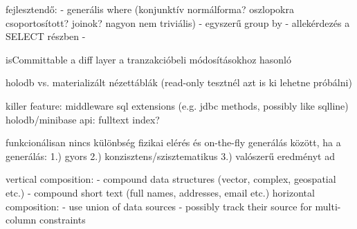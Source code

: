 \documentclass[
    parspace, %
    noindent, %
]{elteiktdk}[2023/04/10]
\begin{document}
{fejlesztendő:
- generális where (konjunktív normálforma? oszlopokra csoportosított? joinok? nagyon nem triviális)
- egyszerű group by
- allekérdezés a SELECT részben
- 

isCommittable
a diff layer a tranzakcióbeli módosításokhoz hasonló

holodb vs. materializált nézettáblák
(read-only tesztnél azt is ki lehetne próbálni)

killer feature: middleware
sql extensions (e.g. jdbc methods, possibly like sqlline)
holodb/minibase api: fulltext index?

funkcionálisan nincs különbség fizikai elérés és on-the-fly generálás között, ha a generálás:
1.) gyors
2.) konzisztens/szisztematikus
3.) valószerű eredményt ad

vertical composition: 
- compound data structures (vector, complex, geospatial etc.)
- compound short text (full names, addresses, email etc.)
horizontal composition:
- use union of data sources
- possibly track their source for multi-column constraints
}
\end{document}
